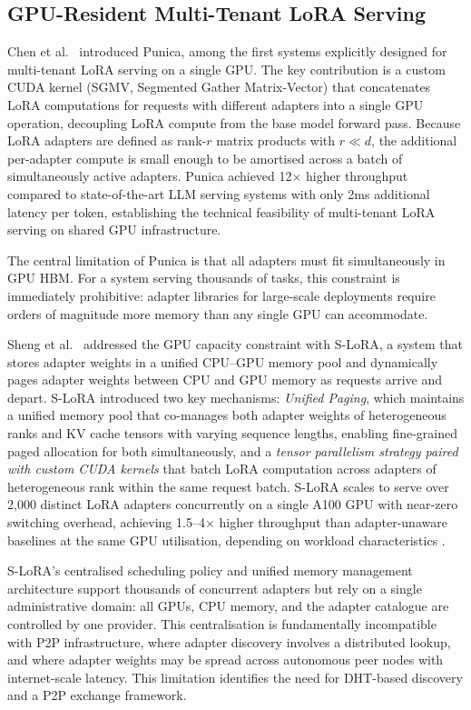 \subsection{GPU-Resident Multi-Tenant LoRA Serving}
\label{sec:inference_systems:punica}

Chen et al.~\cite{Chen2023Punica} introduced Punica, among the first systems explicitly designed for
multi-tenant LoRA serving on a single GPU. The key contribution is a custom CUDA kernel
(SGMV, Segmented Gather Matrix-Vector) that concatenates LoRA computations for requests with different adapters into
a single GPU operation, decoupling LoRA compute from the base model forward pass.
Because LoRA adapters are defined as rank-$r$ matrix products with $r \ll d$, the
additional per-adapter compute is small enough to be amortised across a batch of
simultaneously active adapters. Punica achieved 12$\times$ higher throughput compared to state-of-the-art LLM serving
systems with only 2ms additional latency per token, establishing the technical
feasibility of multi-tenant LoRA serving on shared GPU infrastructure.

The central limitation of Punica is that all adapters must fit simultaneously in GPU HBM.
For a system serving thousands of tasks, this constraint is immediately prohibitive:
adapter libraries for large-scale deployments require orders of magnitude more memory
than any single GPU can accommodate.

Sheng et al.~\cite{Sheng2024} addressed the GPU capacity constraint with S-LoRA, a system that
stores adapter weights in a unified CPU--GPU memory pool and dynamically pages adapter
weights between CPU and GPU memory as requests arrive and depart. S-LoRA introduced
two key mechanisms: \textit{Unified Paging}, which maintains a unified memory pool that co-manages both adapter weights of
heterogeneous ranks and KV cache tensors with varying sequence lengths, enabling
fine-grained paged allocation for both simultaneously, and a \textit{tensor parallelism
strategy paired with custom CUDA kernels} that batch LoRA computation across adapters
of heterogeneous rank within the same request batch. S-LoRA
scales to serve over 2,000 distinct LoRA adapters concurrently on a single A100 GPU
with near-zero switching overhead, achieving 1.5--4$\times$ higher throughput than
adapter-unaware baselines at the same GPU utilisation, depending on workload
characteristics \cite{Sheng2024}.

S-LoRA's centralised scheduling policy and unified memory management architecture support
thousands of concurrent adapters but rely on a single administrative domain: all GPUs,
CPU memory, and the adapter catalogue are controlled by one provider. This centralisation
is fundamentally incompatible with P2P infrastructure, where adapter discovery involves
a distributed lookup, and where adapter weights may be spread across autonomous peer
nodes with internet-scale latency. This limitation identifies the need for DHT-based
discovery and a P2P exchange framework.


